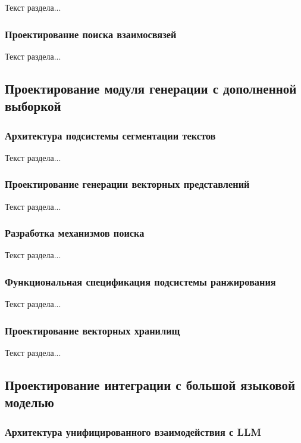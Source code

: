 Текст раздела...

\subsubsection{Проектирование поиска взаимосвязей}

Текст раздела...

\subsection{Проектирование модуля генерации с дополненной выборкой}

\subsubsection{Архитектура подсистемы сегментации текстов}

Текст раздела...

\subsubsection{Проектирование генерации векторных представлений}

Текст раздела...

\subsubsection{Разработка механизмов поиска}

Текст раздела...

\subsubsection{Функциональная спецификация подсистемы ранжирования}

Текст раздела...

\subsubsection{Проектирование векторных хранилищ}

Текст раздела...

\subsection{Проектирование интеграции с большой языковой моделью}

\subsubsection{Архитектура унифицированного взаимодействия с LLM}


